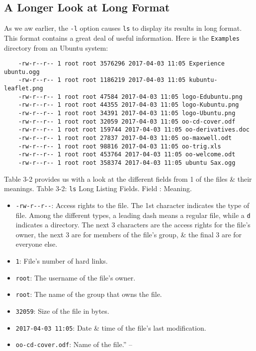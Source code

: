 \documentclass[oneside]{book}
\numberwithin{equation}{section}
\begin{document}
\subsection{A Longer Look at Long Format}
As we aw earlier, the \texttt{-l} option causes \texttt{ls} to display its results in long format. This format contains a great deal of useful information. Here is the \texttt{Examples} directory from an Ubuntu system:
\begin{verbatim}
	-rw-r--r-- 1 root root 3576296 2017-04-03 11:05 Experience ubuntu.ogg
	-rw-r--r-- 1 root root 1186219 2017-04-03 11:05 kubuntu-leaflet.png
	-rw-r--r-- 1 root root 47584 2017-04-03 11:05 logo-Edubuntu.png
	-rw-r--r-- 1 root root 44355 2017-04-03 11:05 logo-Kubuntu.png
	-rw-r--r-- 1 root root 34391 2017-04-03 11:05 logo-Ubuntu.png
	-rw-r--r-- 1 root root 32059 2017-04-03 11:05 oo-cd-cover.odf
	-rw-r--r-- 1 root root 159744 2017-04-03 11:05 oo-derivatives.doc
	-rw-r--r-- 1 root root 27837 2017-04-03 11:05 oo-maxwell.odt
	-rw-r--r-- 1 root root 98816 2017-04-03 11:05 oo-trig.xls
	-rw-r--r-- 1 root root 453764 2017-04-03 11:05 oo-welcome.odt
	-rw-r--r-- 1 root root 358374 2017-04-03 11:05 ubuntu Sax.ogg
\end{verbatim}
Table 3-2 provides us with a look at the different fields from 1 of the files \& their meanings. \textsf{Table 3-2: \texttt{ls} Long Listing Fields. Field : Meaning.}
\begin{itemize}
	\item \verb|-rw-r--r--|: Access rights to the file. The 1st character indicates the type of file. Among the different types, a leading dash means a regular file, while a \texttt{d} indicates a directory. The next 3 characters are the access rights for the file's owner, the next 3 are for members of the file's group, \& the final 3 are for everyone else.
	\item \texttt{1}: File's number of hard links.
	\item \texttt{root}: The username of the file's owner.
	\item \texttt{root}: The name of the group that owns the file.
	\item \texttt{32059}: Size of the file in bytes.
	\item \texttt{2017-04-03 11:05}: Date \& time of the file's last modification.
	\item \texttt{oo-cd-cover.odf}: Name of the file.'' -- \cite[pp. 53--54]{Shotts2019}
\end{itemize}
\end{document}
